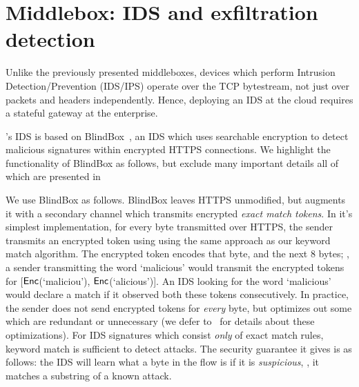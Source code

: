


\section{Middlebox: IDS and exfiltration detection}\label{sec:ids}
Unlike the previously presented middleboxes, devices which perform Intrusion Detection/Prevention (IDS/IPS) operate over the TCP bytestream, not just over packets and headers independently.
Hence, deploying an IDS at the cloud requires a stateful gateway at the enterprise.

\sys's IDS is based on BlindBox~\cite{blindbox}, an IDS which uses searchable encryption to detect malicious signatures within encrypted HTTPS connections. We highlight the functionality of BlindBox as follows, but exclude many important details all of which are presented in~\cite{blindbox}

We use BlindBox as follows.
BlindBox leaves HTTPS unmodified, but augments it with a secondary channel which transmits encrypted {\it exact match tokens}.
In it's simplest implementation, for every byte transmitted over HTTPS, the sender transmits an encrypted token using using the same approach as our keyword match algorithm.
The encrypted token encodes that byte, and the next 8 bytes; \eg{}, a sender transmitting the word `malicious' would transmit the encrypted tokens for [$\mathsf{Enc}$(`maliciou'), $\mathsf{Enc}$(`alicious')].
An IDS looking for the word `malicious' would declare a match if it observed both these tokens consecutively.
In practice, the sender does not send encrypted tokens for {\it every} byte, but optimizes out some which are redundant or unnecessary (we defer to~\cite{blindbox} for details about these optimizations).
For IDS signatures which consist {\it only} of exact match rules, keyword match is sufficient to detect attacks.
The security guarantee it gives is as follows: the IDS will learn what a byte in the flow is if it is {\it suspicious}, \ie{}, it matches a substring of a known attack.


